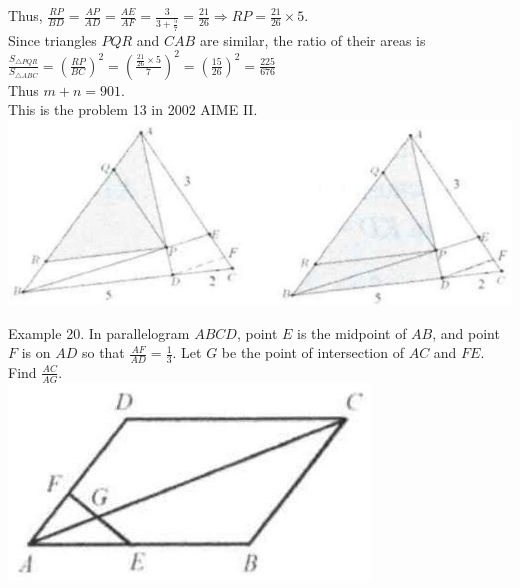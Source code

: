 \documentclass[10pt]{article}
\begin{document}
Thus, \(\frac{R P}{B D}=\frac{A P}{A D}=\frac{A E}{A F}=\frac{3}{3+\frac{5}{7}}=\frac{21}{26} \Rightarrow R P=\frac{21}{26} \times 5\).\\
Since triangles \(P Q R\) and \(C A B\) are similar, the ratio of their areas is\\
\(\frac{S_{\triangle P Q R}}{S_{\triangle A B C}}=\left(\frac{R P}{B C}\right)^{2}=\left(\frac{\frac{21}{26} \times 5}{7}\right)^{2}=\left(\frac{15}{26}\right)^{2}=\frac{225}{676}\)\\
Thus \(m+n=901\).\\
This is the problem 13 in 2002 AIME II.\\
\includegraphics[max width=\textwidth, center]{2025_04_17_97bc1f7e44d93c271a88g-123(2)}

Example 20. In parallelogram \(A B C D\), point \(E\) is the midpoint of \(A B\), and point \(F\) is on \(A D\) so that \(\frac{A F}{A D}=\frac{1}{3}\). Let \(G\) be the point of intersection of \(A C\) and \(F E\). Find \(\frac{A C}{A G}\).\\
\includegraphics[max width=\textwidth, center]{2025_04_17_97bc1f7e44d93c271a88g-123}
\end{document}
